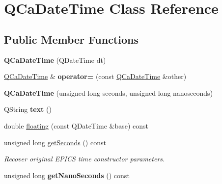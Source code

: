 \hypertarget{classQCaDateTime}{
\section{QCaDateTime Class Reference}
\label{classQCaDateTime}
}
\subsection*{Public Member Functions}
\begin{DoxyCompactItemize}
\item 
\hypertarget{classQCaDateTime_a36100ef216bcd3edef848a5af0bf1f3a}{
{\bfseries QCaDateTime} (QDateTime dt)}
\label{classQCaDateTime_a36100ef216bcd3edef848a5af0bf1f3a}

\item 
\hypertarget{classQCaDateTime_a2b6455a8511f88a2bfc346f70587664e}{
\hyperlink{classQCaDateTime}{QCaDateTime} \& {\bfseries operator=} (const \hyperlink{classQCaDateTime}{QCaDateTime} \&other)}
\label{classQCaDateTime_a2b6455a8511f88a2bfc346f70587664e}

\item 
\hypertarget{classQCaDateTime_a002a1cbbbc6d949aa04ec154f5f2e928}{
{\bfseries QCaDateTime} (unsigned long seconds, unsigned long nanoseconds)}
\label{classQCaDateTime_a002a1cbbbc6d949aa04ec154f5f2e928}

\item 
\hypertarget{classQCaDateTime_a514a6367a3be19ab53dcea6c898d0f07}{
QString {\bfseries text} ()}
\label{classQCaDateTime_a514a6367a3be19ab53dcea6c898d0f07}

\item 
double \hyperlink{classQCaDateTime_ace7b4c21d17575d2a1345bfc1340962f}{floating} (const QDateTime \&base) const 
\item 
\hypertarget{classQCaDateTime_a8ef4952a1876de4649ec3dd87df98666}{
unsigned long \hyperlink{classQCaDateTime_a8ef4952a1876de4649ec3dd87df98666}{getSeconds} () const }
\label{classQCaDateTime_a8ef4952a1876de4649ec3dd87df98666}

\begin{DoxyCompactList}\small\item\em Recover original EPICS time constructor parameters. \end{DoxyCompactList}\item 
\hypertarget{classQCaDateTime_ac82d5d1e1a23c45887a960563d09f787}{
unsigned long {\bfseries getNanoSeconds} () const }
\label{classQCaDateTime_ac82d5d1e1a23c45887a960563d09f787}

\end{DoxyCompactItemize}


